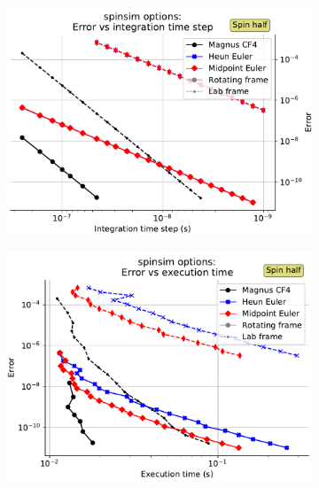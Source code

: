 \documentclass{jors}
\begin{document}
		\begin{figure}[h!]
			\begin{subfigure}[b]{0.475\textwidth}
				\includegraphics[scale=0.475]{benchmark_spin_half_step_error.pdf}
				\caption{}
				\label{fig:benchmark_spin_half_step_error}
			\end{subfigure}
			\hfill
			\begin{subfigure}[b]{0.475\textwidth}
				\includegraphics[scale=0.475]{benchmark_spin_half_execution_error.pdf}
				\caption{}
				\label{fig:benchmark_spin_half_execution_error}
			\end{subfigure}

\end{figure}
\end{document}
